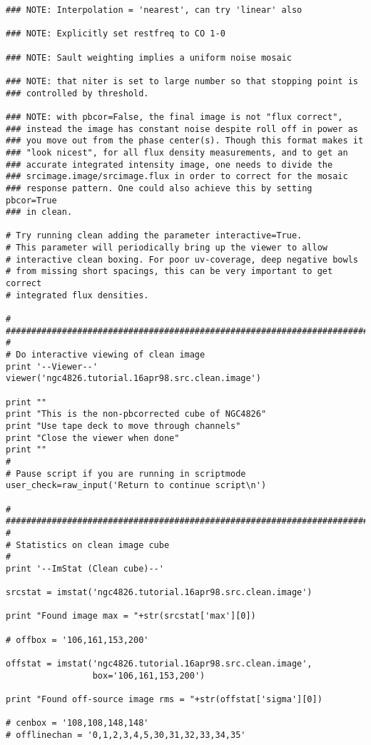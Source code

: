 \begin{verbatim}
### NOTE: Interpolation = 'nearest', can try 'linear' also

### NOTE: Explicitly set restfreq to CO 1-0

### NOTE: Sault weighting implies a uniform noise mosaic 

### NOTE: that niter is set to large number so that stopping point is
### controlled by threshold.

### NOTE: with pbcor=False, the final image is not "flux correct",
### instead the image has constant noise despite roll off in power as
### you move out from the phase center(s). Though this format makes it
### "look nicest", for all flux density measurements, and to get an
### accurate integrated intensity image, one needs to divide the
### srcimage.image/srcimage.flux in order to correct for the mosaic
### response pattern. One could also achieve this by setting pbcor=True
### in clean.

# Try running clean adding the parameter interactive=True.
# This parameter will periodically bring up the viewer to allow
# interactive clean boxing. For poor uv-coverage, deep negative bowls
# from missing short spacings, this can be very important to get correct
# integrated flux densities.

#
##########################################################################
#
# Do interactive viewing of clean image
print '--Viewer--'
viewer('ngc4826.tutorial.16apr98.src.clean.image')

print ""
print "This is the non-pbcorrected cube of NGC4826"
print "Use tape deck to move through channels"
print "Close the viewer when done"
print ""
#
# Pause script if you are running in scriptmode
user_check=raw_input('Return to continue script\n')

#
##########################################################################
#
# Statistics on clean image cube
#
print '--ImStat (Clean cube)--'

srcstat = imstat('ngc4826.tutorial.16apr98.src.clean.image')

print "Found image max = "+str(srcstat['max'][0])

# offbox = '106,161,153,200'

offstat = imstat('ngc4826.tutorial.16apr98.src.clean.image',
                 box='106,161,153,200')

print "Found off-source image rms = "+str(offstat['sigma'][0])

# cenbox = '108,108,148,148'
# offlinechan = '0,1,2,3,4,5,30,31,32,33,34,35'


\end{verbatim}
